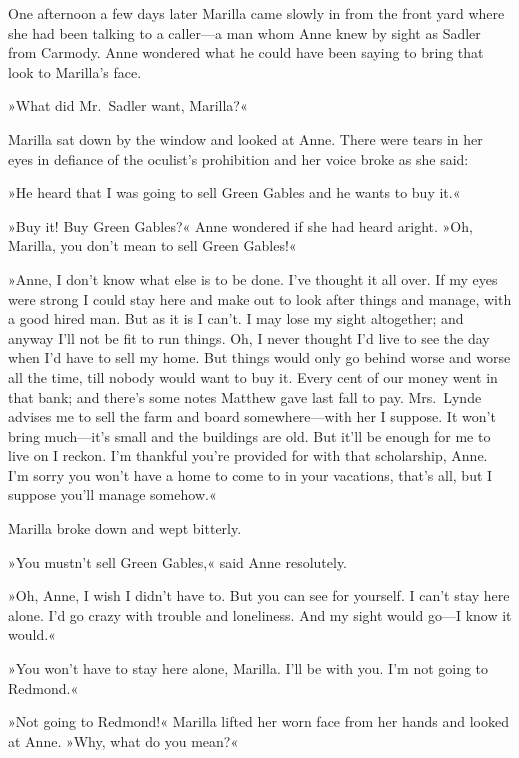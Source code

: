 One afternoon a few days later Marilla came slowly in from the front yard where she had been talking to a caller—a man whom Anne knew by sight as Sadler from Carmody. Anne wondered what he could have been saying to bring that look to Marilla's face.

»What did Mr.~Sadler want, Marilla?«

Marilla sat down by the window and looked at Anne. There were tears in her eyes in defiance of the oculist's prohibition and her voice broke as she said:

»He heard that I was going to sell Green Gables and he wants to buy it.«

»Buy it! Buy Green Gables?« Anne wondered if she had heard aright. »Oh, Marilla, you don't mean to sell Green Gables!«

»Anne, I don't know what else is to be done. I've thought it all over. If my eyes were strong I could stay here and make out to look after things and manage, with a good hired man. But as it is I can't. I may lose my sight altogether; and anyway I'll not be fit to run things. Oh, I never thought I'd live to see the day when I'd have to sell my home. But things would only go behind worse and worse all the time, till nobody would want to buy it. Every cent of our money went in that bank; and there's some notes Matthew gave last fall to pay. Mrs.~Lynde advises me to sell the farm and board somewhere—with her I suppose. It won't bring much—it's small and the buildings are old. But it'll be enough for me to live on I reckon. I'm thankful you're provided for with that scholarship, Anne. I'm sorry you won't have a home to come to in your vacations, that's all, but I suppose you'll manage somehow.«

Marilla broke down and wept bitterly.

»You mustn't sell Green Gables,« said Anne resolutely.

»Oh, Anne, I wish I didn't have to. But you can see for yourself. I can't stay here alone. I'd go crazy with trouble and loneliness. And my sight would go—I know it would.«

»You won't have to stay here alone, Marilla. I'll be with you. I'm not going to Redmond.«

»Not going to Redmond!« Marilla lifted her worn face from her hands and looked at Anne. »Why, what do you mean?«

